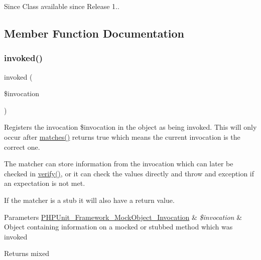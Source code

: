 \begin{DoxySince}{Since}
Class available since Release 1..  
\end{DoxySince}


\subsection{Member Function Documentation}
\mbox{\label{class_p_h_p_unit___framework___mock_object___matcher___stateless_invocation_a63f37b06181c9547bc3c225007c34425}} 
\subsubsection{\texorpdfstring{invoked()}{invoked()}}
{\footnotesize\ttfamily invoked (\begin{DoxyParamCaption}\item[{\mbox{\hyperlink{interface_p_h_p_unit___framework___mock_object___invocation}{P\+H\+P\+Unit\+\_\+\+Framework\+\_\+\+Mock\+Object\+\_\+\+Invocation}}}]{\$invocation }\end{DoxyParamCaption})}

Registers the invocation \$invocation in the object as being invoked. This will only occur after \mbox{\hyperlink{interface_p_h_p_unit___framework___mock_object___matcher___invocation_a4988c6fa11e275302172d0a4ae32dd3a}{matches()}} returns true which means the current invocation is the correct one.

The matcher can store information from the invocation which can later be checked in \mbox{\hyperlink{class_p_h_p_unit___framework___mock_object___matcher___stateless_invocation_aa33600b6a1b28d0c4dfe4d468272aaa4}{verify()}}, or it can check the values directly and throw and exception if an expectation is not met.

If the matcher is a stub it will also have a return value.


\begin{DoxyParams}[1]{Parameters}
\mbox{\hyperlink{interface_p_h_p_unit___framework___mock_object___invocation}{P\+H\+P\+Unit\+\_\+\+Framework\+\_\+\+Mock\+Object\+\_\+\+Invocation}} & {\em \$invocation} & Object containing information on a mocked or stubbed method which was invoked\\
\hline
\end{DoxyParams}
\begin{DoxyReturn}{Returns}
mixed 
\end{DoxyReturn}


